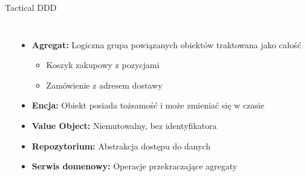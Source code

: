 \documentclass[aspectratio=169,xcolor=table]{beamer}
\begin{document}
\begin{frame}{Tactical DDD}
  \begin{columns}
    \begin{center}
    \end{center}
    
    \begin{itemize}
      \item \textbf{Agregat:} Logiczna grupa powiązanych obiektów traktowana jako całość
        \begin{itemize}
          \item Koszyk zakupowy z pozycjami
          \item Zamówienie z adresem dostawy
        \end{itemize}
      \item \textbf{Encja:} Obiekt posiada tożsamość i może zmieniać się w czasie
      \item \textbf{Value Object:} Niemutowalny, bez identyfikatora
      \item \textbf{Repozytorium:} Abstrakcja dostępu do danych
      \item \textbf{Serwis domenowy:} Operacje przekraczające agregaty
    \end{itemize}
  \end{columns}
\end{frame}
\end{document}
